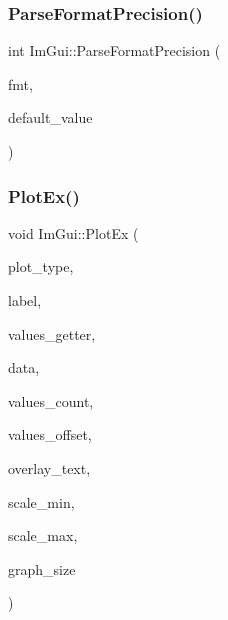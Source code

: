 \mbox{\label{namespace_im_gui_a40943047a2f8cad978fabffcbd26805f}} 
\subsubsection{\texorpdfstring{Parse\+Format\+Precision()}{ParseFormatPrecision()}}
{\footnotesize\ttfamily int Im\+Gui\+::\+Parse\+Format\+Precision (\begin{DoxyParamCaption}\item[{const char $\ast$}]{fmt,  }\item[{int}]{default\+\_\+value }\end{DoxyParamCaption})}

\mbox{\label{namespace_im_gui_a0a18ae07b294d5667f95a5c003d2efb6}} 
\subsubsection{\texorpdfstring{Plot\+Ex()}{PlotEx()}}
{\footnotesize\ttfamily void Im\+Gui\+::\+Plot\+Ex (\begin{DoxyParamCaption}\item[{\mbox{\hyperlink{imgui__internal_8h_a9d5efcdd8895aa3544f1e8ce366c2728}{Im\+Gui\+Plot\+Type}}}]{plot\+\_\+type,  }\item[{const char $\ast$}]{label,  }\item[{float($\ast$)(void $\ast$data, int idx)}]{values\+\_\+getter,  }\item[{void $\ast$}]{data,  }\item[{int}]{values\+\_\+count,  }\item[{int}]{values\+\_\+offset,  }\item[{const char $\ast$}]{overlay\+\_\+text,  }\item[{float}]{scale\+\_\+min,  }\item[{float}]{scale\+\_\+max,  }\item[{\mbox{\hyperlink{struct_im_vec2}{Im\+Vec2}}}]{graph\+\_\+size }\end{DoxyParamCaption})}

\mbox{\label{namespace_im_gui_af7a92b2118981835b5251bfdaac50252}} 
